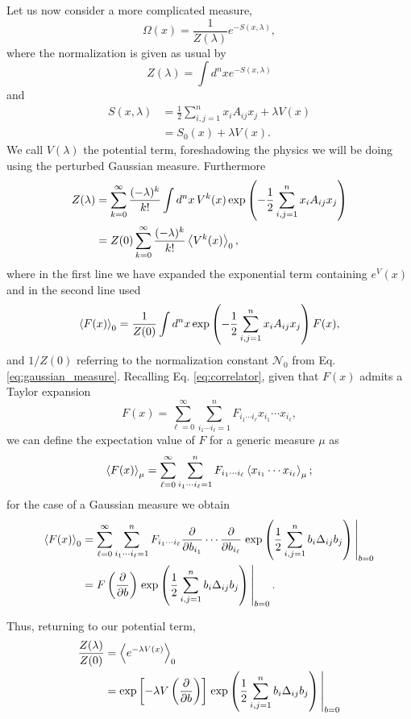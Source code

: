 \documentclass{article}
\numberwithin{equation}{section}
\begin{document}
Let us now consider a more complicated measure,
\begin{equation}
    \Omega(x) = \frac{1}{Z(\lambda)}e^{-S(x, \lambda)},
\end{equation}
where the normalization is given as usual by 
\begin{equation}
    Z(\lambda) = \int d^nx e^{-S(x,\lambda)}
\end{equation}
and
\begin{equation}
\begin{aligned}
    S(x, \lambda) &= \frac{1}{2} \sum_{i, j = 1}^n x_i A_{ij}x_j + \lambda V(x) \\
    &= S_0(x) + \lambda V(x).
\end{aligned}
\end{equation}
We call $V(\lambda)$ the potential term, foreshadowing the physics we will be doing using the perturbed Gaussian measure. Furthermore
\begin{equation}
\begin{aligned}
    Z(\lambda) &= \sum_{k=0}^\infty \frac{(-\lambda)^k}{k!} \int d^nx \, V^k(x) \exp\left(-\frac{1}{2} \sum_{i,j=1}^n x_i A_{ij} x_j\right) \\
    &= Z(0) \sum_{k=0}^\infty \frac{(-\lambda)^k}{k!} \ev{V^k(x)}_0,
\end{aligned}
\end{equation}
where in the first line we have expanded the exponential term containing $e^V(x)$ and in the second line used
\begin{equation}
    \ev{F(x)}_0 = \frac{1}{Z(0)} \int d^nx \exp\left(-\frac{1}{2} \sum_{i,j=1}^n x_i A_{ij} x_j\right) F(x),
\end{equation}
and $1/Z(0)$ referring to the normalization constant $\mathcal{N}_0$ from Eq. \ref{eq:gaussian_measure}. Recalling Eq. \ref{eq:correlator}, given that $F(x)$ admits a Taylor expansion
\begin{equation}
    F(x) = \sum_{\ell = 0}^\infty \sum_{i_1 \cdots i_\ell = 1}^n F_{i_1 \cdots i_\ell} x_{i_1} \cdots x_{i_\ell},
\end{equation}
we can define the expectation value of $F$ for a generic measure $\mu$ as 
\begin{equation}
    \ev{F(x)}_\mu = \sum_{\ell = 0}^\infty \sum_{i_1 \cdots i_\ell = 1}^n F_{i_1 \cdots i_\ell} \ev{x_{i_1} \cdots x_{i_\ell}}_\mu;
\end{equation}
for the case of a Gaussian measure we obtain
\begin{equation}
\begin{aligned}
    \ev{F(x)}_0 &= \sum_{\ell = 0}^\infty \sum_{i_1 \cdots i_\ell = 1}^n F_{i_1 \cdots i_\ell} \pdv{b_{i_1}} \cdots \pdv{b_{i_\ell}} \eval{\exp\left(\frac{1}{2}\sum_{i,j=1}^n b_i \Delta_{ij} b_j\right)}_{b=0} \\
    &= F \left(\pdv{b}\right) \eval{\exp\left(\frac{1}{2}\sum_{i,j=1}^n b_i \Delta_{ij} b_j\right)}_{b=0}.
\end{aligned}
\end{equation}

Thus, returning to our potential term,
\begin{equation}
\begin{aligned}
    \frac{Z(\lambda)}{Z(0)} &= \ev{e^{-\lambda V(x)}}_0 \\
    &= \exp\left[-\lambda V\left(\pdv{b}\right)\right] \eval{\exp\left(\frac{1}{2}\sum_{i,j=1}^n b_i \Delta_{ij} b_j\right)}_{b=0}
\end{aligned}
\end{equation}
\end{document}
